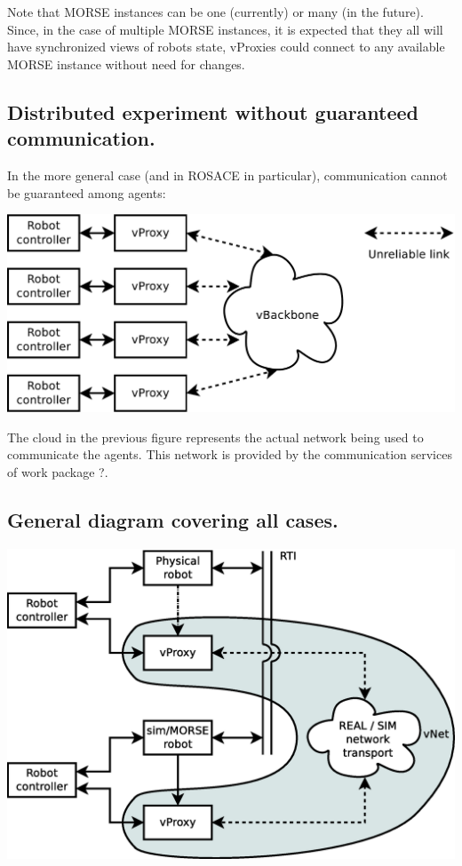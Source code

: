 \documentclass[a4paper,11pt]{article}
\begin{document}
Note that MORSE instances can be one (currently) or many (in the future). Since, in the case of multiple MORSE instances, it is expected that they all will have synchronized views of robots state, vProxies could connect to any available MORSE instance without need for changes.

\subsection{Distributed experiment without guaranteed communication.}

In the more general case (and in ROSACE in particular), communication cannot be guaranteed among agents:

\begin{center}
\includegraphics[width=0.666\columnwidth]{figures/distrib}
\end{center}

The cloud in the previous figure represents the actual network being used to
communicate the agents. This network is provided by the communication services
of work package ?.

\subsection{General diagram covering all cases.}

\begin{center}
\includegraphics[width=0.666\columnwidth]{figures/vnet-general}
\end{center}
\end{document}
